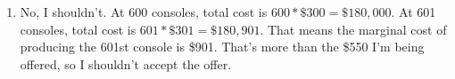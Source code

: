 \documentclass{article}
\begin{document}
\begin{enumerate}
\begin{enumerate}
	\item When marginal cost is lower than average total cost, average total cost is decreasing because producing additional units at lower cost pulls the average down. When marginal cost is higher than average total cost, average total cost is increasing because producing additional units at higher cost pulls the average up.
	
	\end{enumerate}
	
\item No, I shouldn't. At 600 consoles, total cost is $600 * \$300 = \$180,000$. At 601 consoles, total cost is $601 * \$301 = \$180,901$. That means the marginal cost of producing the 601st console is \$901. That's more than the \$550 I'm being offered, so I shouldn't accept the offer.

\end{enumerate}
\end{document}
